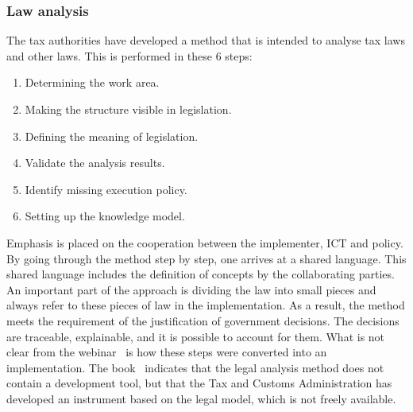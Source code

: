\subsubsection{Law analysis} \label{law_analysis}
The tax authorities have developed a method that is intended to analyse tax laws and other laws.
This is performed in these 6 steps:
\begin{enumerate}
    \item Determining the work area.
    \item Making the structure visible in legislation.
    \item Defining the meaning of legislation.
    \item Validate the analysis results.
    \item Identify missing execution policy.
    \item Setting up the knowledge model.
\end{enumerate}
Emphasis is placed on the cooperation between the implementer, ICT and policy.
By going through the method step by step, one arrives at a shared language.
This shared language includes the definition of concepts by the collaborating parties.
An important part of the approach is dividing the law into small pieces and always refer to these pieces of law in the implementation.
As a result, the method meets the requirement of the justification of government decisions.
The decisions are traceable, explainable, and it is possible to account for them.
What is not clear from the webinar~ is how these steps were converted into an implementation.
The book~ indicates that the legal analysis method does not contain a development tool, but that the Tax and Customs Administration has developed an instrument based on the legal model, which is not freely available.